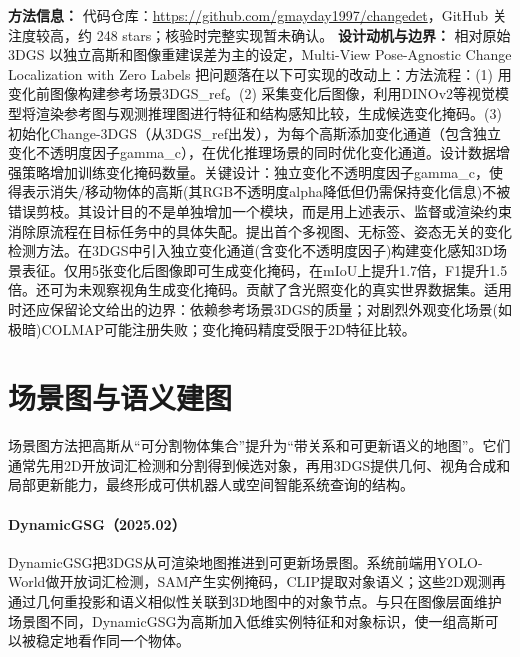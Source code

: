 \textbf{方法信息：} 代码仓库：\url{https://github.com/gmayday1997/changedet}，GitHub 关注度较高，约 248 stars；核验时完整实现暂未确认。
\textbf{设计动机与边界：} 相对原始 3DGS 以独立高斯和图像重建误差为主的设定，Multi-View Pose-Agnostic Change Localization with Zero Labels 把问题落在以下可实现的改动上：方法流程：(1) 用变化前图像构建参考场景3DGS\_ref。(2) 采集变化后图像，利用DINOv2等视觉模型将渲染参考图与观测推理图进行特征和结构感知比较，生成候选变化掩码。(3) 初始化Change-3DGS（从3DGS\_ref出发），为每个高斯添加变化通道（包含独立变化不透明度因子gamma\_c），在优化推理场景的同时优化变化通道。设计数据增强策略增加训练变化掩码数量。关键设计：独立变化不透明度因子gamma\_c，使得表示消失/移动物体的高斯(其RGB不透明度alpha降低但仍需保持变化信息)不被错误剪枝。其设计目的不是单独增加一个模块，而是用上述表示、监督或渲染约束消除原流程在目标任务中的具体失配。提出首个多视图、无标签、姿态无关的变化检测方法。在3DGS中引入独立变化通道(含变化不透明度因子)构建变化感知3D场景表征。仅用5张变化后图像即可生成变化掩码，在mIoU上提升1.7倍，F1提升1.5倍。还可为未观察视角生成变化掩码。贡献了含光照变化的真实世界数据集。适用时还应保留论文给出的边界：依赖参考场景3DGS的质量；对剧烈外观变化场景(如极暗)COLMAP可能注册失败；变化掩码精度受限于2D特征比较。

\section{场景图与语义建图}

场景图方法把高斯从“可分割物体集合”提升为“带关系和可更新语义的地图”。它们通常先用2D开放词汇检测和分割得到候选对象，再用3DGS提供几何、视角合成和局部更新能力，最终形成可供机器人或空间智能系统查询的结构。
\paragraph{DynamicGSG（2025.02）\cite{2502_15309}}
DynamicGSG把3DGS从可渲染地图推进到可更新场景图。系统前端用YOLO-World做开放词汇检测，SAM产生实例掩码，CLIP提取对象语义；这些2D观测再通过几何重投影和语义相似性关联到3D地图中的对象节点。与只在图像层面维护场景图不同，DynamicGSG为高斯加入低维实例特征和对象标识，使一组高斯可以被稳定地看作同一个物体。

